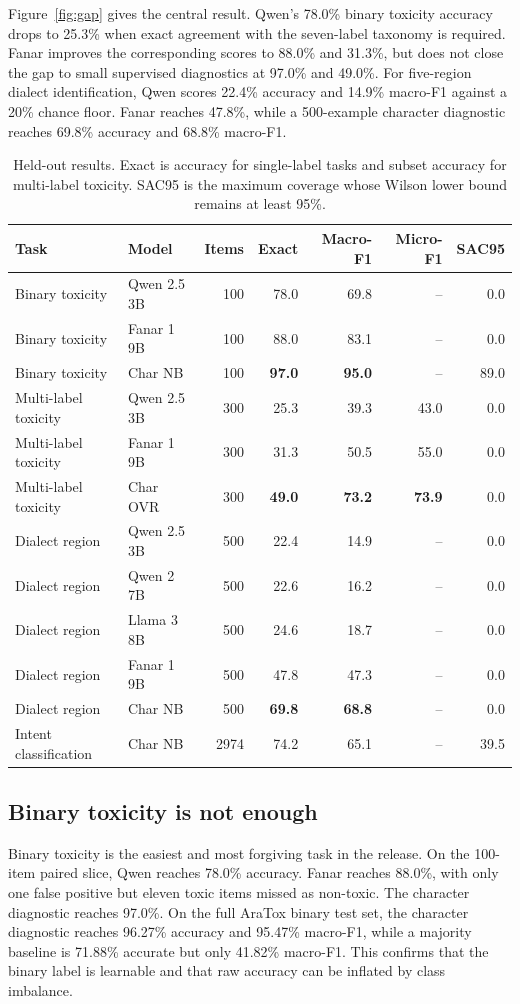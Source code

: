 \documentclass[10pt,twocolumn]{article}
\begin{document}
Figure~\ref{fig:gap} gives the central result. Qwen's 78.0\% binary toxicity
accuracy drops to 25.3\% when exact agreement with the seven-label taxonomy is
required. Fanar improves the corresponding scores to 88.0\% and 31.3\%, but
does not close the gap to small supervised diagnostics at 97.0\% and 49.0\%.
For five-region dialect identification, Qwen scores 22.4\% accuracy and 14.9\%
macro-F1 against a 20\% chance floor. Fanar reaches 47.8\%, while a
500-example character diagnostic reaches 69.8\% accuracy and 68.8\%
macro-F1.

\begin{table}[t]
\centering
\small
\caption{Held-out results. Exact is accuracy for single-label tasks and
subset accuracy for multi-label toxicity. SAC95 is the maximum coverage whose
Wilson lower bound remains at least 95\%.}
\label{tab:results}
\begin{tabular}{llrrrrr}
\toprule
Task & Model & Items & Exact & Macro-F1 & Micro-F1 & SAC95 \\
\midrule
Binary toxicity & Qwen 2.5 3B & 100 & 78.0 & 69.8 & -- & 0.0 \\
Binary toxicity & Fanar 1 9B & 100 & 88.0 & 83.1 & -- & 0.0 \\
Binary toxicity & Char NB & 100 & \textbf{97.0} & \textbf{95.0} & -- & 89.0 \\
Multi-label toxicity & Qwen 2.5 3B & 300 & 25.3 & 39.3 & 43.0 & 0.0 \\
Multi-label toxicity & Fanar 1 9B & 300 & 31.3 & 50.5 & 55.0 & 0.0 \\
Multi-label toxicity & Char OVR & 300 & \textbf{49.0} & \textbf{73.2} & \textbf{73.9} & 0.0 \\
Dialect region & Qwen 2.5 3B & 500 & 22.4 & 14.9 & -- & 0.0 \\
Dialect region & Qwen 2 7B & 500 & 22.6 & 16.2 & -- & 0.0 \\
Dialect region & Llama 3 8B & 500 & 24.6 & 18.7 & -- & 0.0 \\
Dialect region & Fanar 1 9B & 500 & 47.8 & 47.3 & -- & 0.0 \\
Dialect region & Char NB & 500 & \textbf{69.8} & \textbf{68.8} & -- & 0.0 \\
Intent classification & Char NB & 2974 & 74.2 & 65.1 & -- & 39.5 \\
\bottomrule
\end{tabular}
\end{table}

\subsection{Binary toxicity is not enough}
Binary toxicity is the easiest and most forgiving task in the release. On the
100-item paired slice, Qwen reaches 78.0\% accuracy. Fanar reaches 88.0\%,
with only one false positive but eleven toxic items missed as non-toxic. The
character diagnostic reaches 97.0\%. On the full AraTox binary test set, the
character diagnostic reaches 96.27\% accuracy and 95.47\% macro-F1, while a
majority baseline is 71.88\% accurate but only 41.82\% macro-F1. This confirms
that the binary label is learnable and that raw accuracy can be inflated by
class imbalance.
\end{document}
